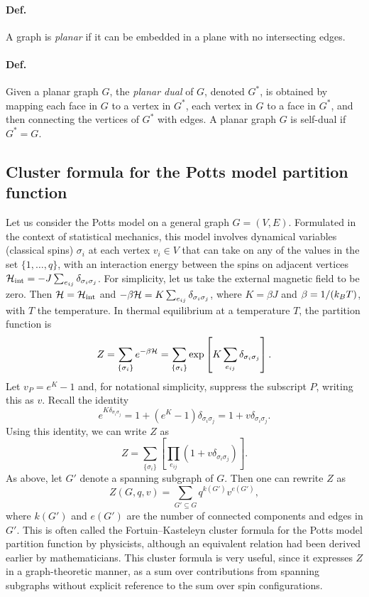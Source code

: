 \paragraph{Def.} A graph is \emph{planar} if it can be embedded in a plane with no intersecting edges.

\paragraph{Def.} Given a planar graph $G$, the \emph{planar dual} of $G$, denoted $G^*$, is obtained by mapping each face in $G$
to a vertex in $G^*$, each vertex in $G$ to a face in $G^*$, and then connecting the vertices of $G^*$ with edges. A planar
graph $G$ is self-dual if $G^* = G$.

\subsection{Cluster formula for the Potts model partition function}

Let us consider the Potts model on a general graph $G = (V,E)$. Formulated in the context of statistical mechanics, this
model involves dynamical variables (classical spins) $\sigma_i$ at each vertex $v_i\in V$ that can take on any of the values
in the set $\{1,\ldots,q\}$, with an interaction energy between the spins on adjacent vertices
$\mathcal{H}_{\text{int}} = -J\sum_{e_{ij}}\delta_{\sigma_i\sigma_j}$. For simplicity, let us take the external magnetic field to be
zero. Then $\mathcal{H} = \mathcal{H}_{\text{int}}$ and $-\beta\mathcal{H} = K\sum_{e_{ij}}\delta_{\sigma_i\sigma_j}$, where $K = \beta J$ and
$\beta = 1/(k_{B} T)$, with $T$ the temperature. In thermal equilibrium at a temperature $T$, the partition function is
\begin{equation}
  Z = \sum_{\{\sigma_i\}}e^{-\beta\mathcal{H}} = \sum_{\{\sigma_i\}}\exp\left[K\sum_{e_{ij}}\delta_{\sigma_i\sigma_j}\right].
\end{equation}
Let $v_P = e^K-1$ and, for notational simplicity, suppress the subscript $P$, writing this as $v$. Recall the identity
\begin{equation}
  e^{K\delta_{\sigma_i\sigma_j}} = 1 + \left(e^K-1\right)\delta_{\sigma_i\sigma_j} = 1 + v\delta_{\sigma_i\sigma_j}.
\end{equation}
Using this identity, we can write $Z$ as
\begin{equation}
  Z = \sum_{\{\sigma_i\}}\left[\prod_{e_{ij}}\left(1+v\delta_{\sigma_i\sigma_j}\right)\right].
\end{equation}
As above, let $G'$ denote a spanning subgraph of $G$. Then one can rewrite $Z$ as
\begin{equation}\label{eq:cluster}
  Z(G,q,v) = \sum_{G'\subseteq G}q^{k(G')}v^{e(G')},
\end{equation}
where $k(G')$ and $e(G')$ are the number of connected components and edges in $G'$. This is often called the
Fortuin--Kasteleyn cluster formula for the Potts model partition function by physicists, although an equivalent relation had
been derived earlier by mathematicians. This cluster formula is very useful, since it expresses $Z$ in a graph-theoretic
manner, as a sum over contributions from spanning subgraphs without explicit reference to the sum over spin configurations.

